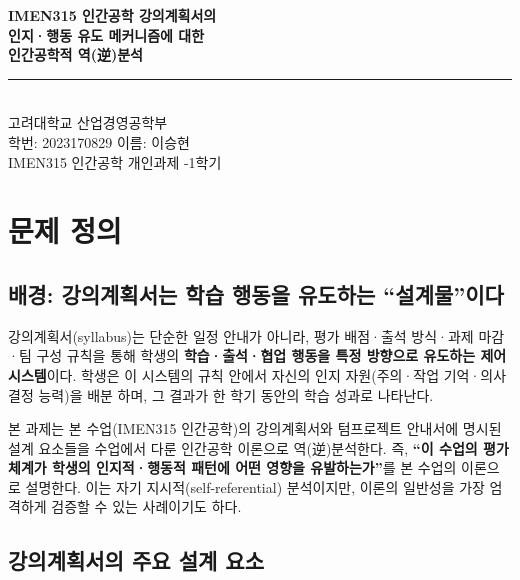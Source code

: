 \documentclass[a4paper,11pt]{article}
\begin{document}
\thispagestyle{fancy}

\begin{center}
  {\LARGE\bfseries\color{mainblue}
    IMEN315 인간공학 강의계획서의\\[4pt]
    인지·행동 유도 메커니즘에 대한\\[4pt]
    인간공학적 역(逆)분석
  }\\[10pt]
  {\color{midgray}\rule{0.68\textwidth}{0.6pt}}\\[8pt]
  {\normalsize
    고려대학교 산업경영공학부\\[3pt]
    학번: 2023170829 \quad 이름: 이승현\\[3pt]
    IMEN315 인간공학 \quad 개인과제 -1학기
  }
\end{center}

\vspace{4pt}

\section{문제 정의}

\subsection{배경: 강의계획서는 학습 행동을 유도하는 ``설계물''이다}

강의계획서(syllabus)는 단순한 일정 안내가 아니라, 평가 배점·출석 방식·과제 마감·팀 구성
규칙을 통해 학생의 \textbf{학습·출석·협업 행동을 특정 방향으로 유도하는 제어 시스템}이다.
학생은 이 시스템의 규칙 안에서 자신의 인지 자원(주의·작업 기억·의사결정 능력)을 배분
하며, 그 결과가 한 학기 동안의 학습 성과로 나타난다.

본 과제는 본 수업(IMEN315 인간공학)의 강의계획서와 텀프로젝트 안내서에 명시된 설계
요소들을 수업에서 다룬 인간공학 이론으로 역(逆)분석한다. 즉, \textbf{``이 수업의 평가
체계가 학생의 인지적·행동적 패턴에 어떤 영향을 유발하는가''}를 본 수업의 이론으로
설명한다. 이는 자기 지시적(self-referential) 분석이지만, 이론의 일반성을 가장 엄격하게
검증할 수 있는 사례이기도 하다.

\subsection{강의계획서의 주요 설계 요소}
\end{document}
